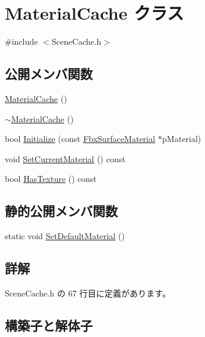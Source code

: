 \hypertarget{class_material_cache}{}\section{Material\+Cache クラス}
\label{class_material_cache}


{\ttfamily \#include $<$Scene\+Cache.\+h$>$}

\subsection*{公開メンバ関数}
\begin{DoxyCompactItemize}
\item 
\hyperlink{class_material_cache_afe2d921eedf94e6d76070bbd37e9a118}{Material\+Cache} ()
\item 
\hyperlink{class_material_cache_a7dd31e54dbebde879ea515e588fadc55}{$\sim$\+Material\+Cache} ()
\item 
bool \hyperlink{class_material_cache_a2f8d3d86af579091b7b719aa1db45a0d}{Initialize} (const \hyperlink{class_fbx_surface_material}{Fbx\+Surface\+Material} $\ast$p\+Material)
\item 
void \hyperlink{class_material_cache_a6de4c5a295159bbca83561749dfef223}{Set\+Current\+Material} () const
\item 
bool \hyperlink{class_material_cache_aa445a6494d0099b63d57c80bc04dfef2}{Has\+Texture} () const
\end{DoxyCompactItemize}
\subsection*{静的公開メンバ関数}
\begin{DoxyCompactItemize}
\item 
static void \hyperlink{class_material_cache_a51881d2f46aa076ca4dfdce641e8fe1f}{Set\+Default\+Material} ()
\end{DoxyCompactItemize}


\subsection{詳解}


 Scene\+Cache.\+h の 67 行目に定義があります。



\subsection{構築子と解体子}
\mbox{\label{class_material_cache_afe2d921eedf94e6d76070bbd37e9a118}} 

